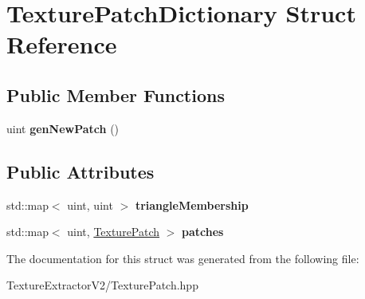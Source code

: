 \hypertarget{struct_texture_patch_dictionary}{}\section{Texture\+Patch\+Dictionary Struct Reference}
\label{struct_texture_patch_dictionary}
\subsection*{Public Member Functions}
\begin{DoxyCompactItemize}
\item 
\hypertarget{struct_texture_patch_dictionary_aba62d1d0383da168f7bdef1050970a92}{}uint {\bfseries gen\+New\+Patch} ()\label{struct_texture_patch_dictionary_aba62d1d0383da168f7bdef1050970a92}

\end{DoxyCompactItemize}
\subsection*{Public Attributes}
\begin{DoxyCompactItemize}
\item 
\hypertarget{struct_texture_patch_dictionary_a188d2b68586a902ef8c969458e9001c6}{}std\+::map$<$ uint, uint $>$ {\bfseries triangle\+Membership}\label{struct_texture_patch_dictionary_a188d2b68586a902ef8c969458e9001c6}

\item 
\hypertarget{struct_texture_patch_dictionary_a21c6633d4831bd84be792b45020f3805}{}std\+::map$<$ uint, \hyperlink{struct_texture_patch}{Texture\+Patch} $>$ {\bfseries patches}\label{struct_texture_patch_dictionary_a21c6633d4831bd84be792b45020f3805}

\end{DoxyCompactItemize}


The documentation for this struct was generated from the following file\+:\begin{DoxyCompactItemize}
\item 
Texture\+Extractor\+V2/Texture\+Patch.\+hpp\end{DoxyCompactItemize}
